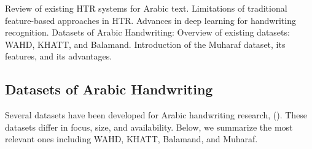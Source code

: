 \documentclass[conference]{IEEEtran}
\begin{document}
Review of existing HTR systems for Arabic text.
Limitations of traditional feature-based approaches in HTR.
Advances in deep learning for handwriting recognition.
Datasets of Arabic Handwriting:
Overview of existing datasets: WAHD, KHATT, and Balamand.
Introduction of the Muharaf dataset, its features, and its advantages.


\blindtext[3]

\subsection{}



\subsection{}





\subsection{Datasets of Arabic Handwriting}

Several datasets have been developed for Arabic handwriting research, (). These datasets differ in focus, size, and availability. Below, we summarize the most relevant ones including WAHD, KHATT, Balamand, and Muharaf.
\end{document}
